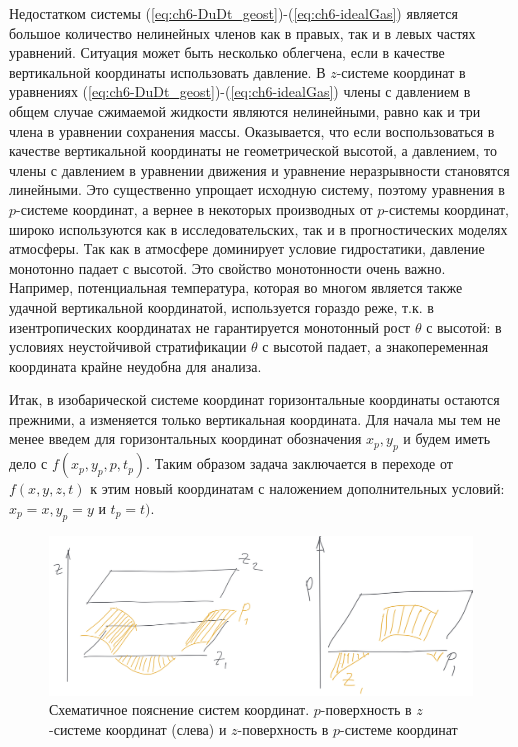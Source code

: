     Недостатком системы (\ref{eq:ch6-DuDt_geost})-(\ref{eq:ch6-idealGas}) является большое количество нелинейных членов как в правых, так и в левых частях уравнений. Ситуация может быть несколько облегчена, если в качестве вертикальной координаты использовать давление. В $z$-системе координат в уравнениях (\ref{eq:ch6-DuDt_geost})-(\ref{eq:ch6-idealGas}) члены с давлением в общем случае сжимаемой жидкости являются нелинейными, равно как и три члена в уравнении сохранения массы. Оказывается, что если воспользоваться в качестве вертикальной координаты не геометрической высотой, а давлением, то члены с давлением в уравнении движения и уравнение неразрывности становятся линейными. Это существенно упрощает исходную систему, поэтому уравнения в $p$-системе координат, а вернее в некоторых производных от $p$-системы координат, широко используются как в исследовательских, так и в прогностических моделях атмосферы. Так как в атмосфере доминирует условие гидростатики, давление монотонно падает с высотой. Это свойство монотонности очень важно. Например, потенциальная температура, которая во многом является также удачной вертикальной координатой, используется гораздо реже, т.к. в изентропических координатах не гарантируется монотонный рост $\theta$ с высотой: в условиях неустойчивой стратификации $\theta$ с высотой падает, а знакопеременная координата крайне неудобна для анализа.

    Итак, в изобарической системе координат горизонтальные координаты остаются прежними, а изменяется только вертикальная координата. Для начала мы тем не менее введем для горизонтальных координат обозначения $x_p, y_p$ и будем иметь дело с $f(x_p,y_p,p,t_p)$. Таким образом задача заключается в переходе от  $f(x,y,z,t)$ к этим новый координатам с наложением дополнительных условий: $x_p=x,y_p=y$ и $t_p=t)$.

    \begin{figure}[h]
    \centering
    \includegraphics[width=0.9\linewidth]{pics/ch6.1.png}
    \caption{\label{fig:ch6.1}
    Схематичное пояснение систем координат. $p$-поверхность в $z$-системе координат (слева) и $z$-поверхность в $p$-системе координат
    }
    \end{figure}    

